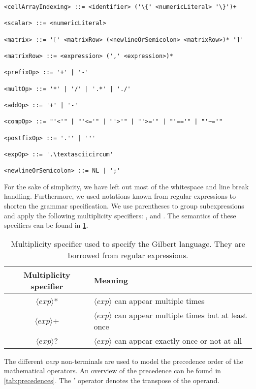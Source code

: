 \begin{lstlisting}
<cellArrayIndexing> ::= <identifier> ('\{' <numericLiteral> '\}')+

<scalar> ::= <numericLiteral>

<matrix> ::= '[' <matrixRow> (<newlineOrSemicolon> <matrixRow>)* ']'

<matrixRow> ::= <expression> (',' <expression>)*

<prefixOp> ::= '+' | '-'

<multOp> ::= '*' | '/' | '.*' | './'

<addOp> ::= '+' | '-'

<compOp> ::= "'<'" | "'<='" | "'>'" | "'>='" | "'=='" | "'~='"

<postfixOp> ::= '.'' | '''

<expOp> ::= '.\textasciicircum'

<newlineOrSemicolon> ::= NL | ';'

\end{lstlisting}

For the sake of simplicity, we have left out most of the whitespace and line break handling.
Furthermore, we used notations known from regular expressions to shorten the grammar specification.
We use parentheses to group subexpressions and apply the following multiplicity specifiers: \code{*}, \code{+} and .
The semantics of these specifiers can be found in \cref{tab:multiplicity}.

\begin{table}[!h]
  \centering
  \begin{tabular}{c|l}
  Multiplicity specifier & Meaning\\
  \hline
  $\langle exp \rangle$* & $\langle exp\rangle$ can appear multiple times \\
  $\langle exp\rangle$+ & $\langle exp\rangle$ can appear multiple times but at least once \\
  $\langle exp\rangle$? & $\langle exp\rangle$ can appear exactly once or not at all
  \end{tabular}
  \caption{Multiplicity specifier used to specify the Gilbert language. They are borrowed from regular expressions.}
  \label{tab:multiplicity}
\end{table}

The different \emph{aexp} non-terminals are used to model the precedence order of the mathematical operators.
An overview of the precedence can be found in \cref{tab:precedences}.
The $'$ operator denotes the transpose of the operand.

